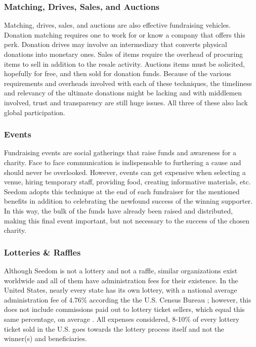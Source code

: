 \documentclass[11pt]{article}
\begin{document}
\subsubsection{Matching, Drives, Sales, and Auctions}

Matching, drives, sales, and auctions are also effective fundraising vehicles. Donation matching requires one to work for or know a company that offers this perk. Donation drives may involve an intermediary that converts physical donations into monetary ones. Sales of items require the overhead of procuring items to sell in addition to the resale activity. Auctions items must be solicited, hopefully for free, and then sold for donation funds. Because of the various requirements and overheads involved with each of these techniques, the timeliness and relevancy of the ultimate donations might be lacking and with middlemen involved, trust and transparency are still huge issues. All three of these also lack global participation.

\subsubsection{Events}

Fundraising events are social gatherings that raise funds and awareness for a charity. Face to face communication is indispensable to furthering a cause and should never be overlooked. However, events can get expensive when selecting a venue, hiring temporary staff, providing food, creating informative materials, etc. Seedom adopts this technique at the end of each fundraiser for the mentioned benefits in addition to celebrating the newfound success of the winning supporter. In this way, the bulk of the funds have already been raised and distributed, making this final event important, but not necessary to the success of the chosen charity.

\subsubsection{Lotteries \& Raffles}

Although Seedom is not a lottery and not a raffle, similar organizations exist worldwide and all of them have administration fees for their existence. In the United States, nearly every state has its own lottery, with a national average administration fee of 4.76\% according the the U.S. Census Bureau \cite{3}; however, this does not include commissions paid out to lottery ticket sellers, which equal this same percentage, on average \cite{4}. All expenses considered, 8-10\% of every lottery ticket sold in the U.S. goes towards the lottery process itself and not the winner(s) and beneficiaries.
\end{document}
